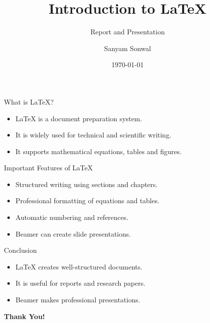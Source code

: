 \documentclass{beamer}
\title{Introduction to LaTeX}
\subtitle{Report and Presentation}
\author{Sanyam Sonwal}
\institute{MNIT Jaipur}
\date{\today}
\begin{document}
\begin{frame}
    \titlepage
\end{frame}

\begin{frame}{What is LaTeX?}
    \begin{itemize}
        \item LaTeX is a document preparation system.
        \item It is widely used for technical and scientific writing.
        \item It supports mathematical equations, tables and figures.
    \end{itemize}
\end{frame}

\begin{frame}{Important Features of LaTeX}
    \begin{itemize}
        \item Structured writing using sections and chapters.
        \item Professional formatting of equations and tables.
        \item Automatic numbering and references.
        \item Beamer can create slide presentations.
    \end{itemize}
\end{frame}

\begin{frame}{Conclusion}
    \begin{itemize}
        \item LaTeX creates well-structured documents.
        \item It is useful for reports and research papers.
        \item Beamer makes professional presentations.
    \end{itemize}

    \vfill
    \centering
    \textbf{Thank You!}
\end{frame}
\end{document}
